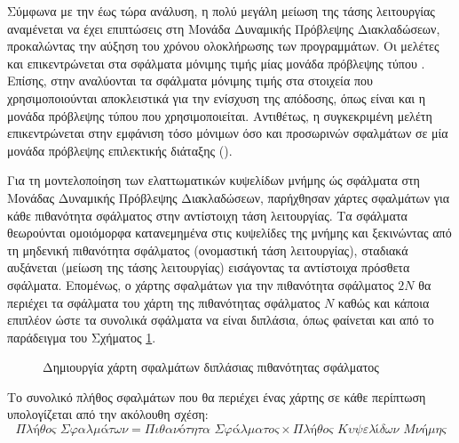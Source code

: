 Σύμφωνα με την έως τώρα ανάλυση, η πολύ μεγάλη μείωση της τάσης λειτουργίας αναμένεται να έχει επιπτώσεις στη Μονάδα Δυναμικής Πρόβλεψης Διακλαδώσεων, προκαλώντας την αύξηση του χρόνου ολοκλήρωσης των προγραμμάτων. Οι μελέτες \cite{hsieh2009tolerance} και \cite{hardy2012performance} επικεντρώνεται στα σφάλματα μόνιμης τιμής μίας μονάδα πρόβλεψης τύπου . Επίσης, στην \cite{foutris2013ssing} αναλύονται τα σφάλματα μόνιμης τιμής στα στοιχεία που χρησιμοποιούνται αποκλειστικά για την ενίσχυση της απόδοσης, όπως είναι και η μονάδα πρόβλεψης τύπου  που χρησιμοποιείται. Αντιθέτως, η συγκεκριμένη μελέτη επικεντρώνεται στην εμφάνιση τόσο μόνιμων όσο και προσωρινών σφαλμάτων σε μία μονάδα πρόβλεψης επιλεκτικής διάταξης ().
\par
Για τη μοντελοποίηση των ελαττωματικών κυψελίδων μνήμης ώς σφάλματα στη Μονάδας Δυναμικής Πρόβλεψης Διακλαδώσεων, παρήχθησαν χάρτες σφαλμάτων για κάθε πιθανότητα σφάλματος στην αντίστοιχη τάση λειτουργίας. Τα σφάλματα θεωρούνται ομοιόμορφα κατανεμημένα στις κυψελίδες της μνήμης και ξεκινώντας από τη μηδενική πιθανότητα σφάλματος (ονομαστική τάση λειτουργίας), σταδιακά αυξάνεται (μείωση της τάσης λειτουργίας) εισάγοντας τα αντίστοιχα πρόσθετα σφάλματα. Επομένως, ο χάρτης σφαλμάτων για την πιθανότητα σφάλματος $2N$ θα περιέχει τα σφάλματα του χάρτη της πιθανότητας σφάλματος $N$ καθώς και κάποια επιπλέον ώστε τα συνολικά σφάλματα να είναι διπλάσια, όπως φαίνεται και από το παράδειγμα του Σχήματος \ref{fig:chap4_fmap_creation}.

\begin{figure}[ht]
    \centering
    \caption{Δημιουργία χάρτη σφαλμάτων διπλάσιας πιθανότητας σφάλματος}
    \label{fig:chap4_fmap_creation}
\end{figure}

Το συνολικό πλήθος σφαλμάτων που θα περιέχει ένας χάρτης σε κάθε περίπτωση υπολογίζεται από την ακόλουθη σχέση:
\begin{equation}
    \textit{Πλήθος Σφαλμάτων} = \textit{Πιθανότητα Σφάλματος} \times \textit{Πλήθος Κυψελίδων Μνήμης}
\end{equation}

